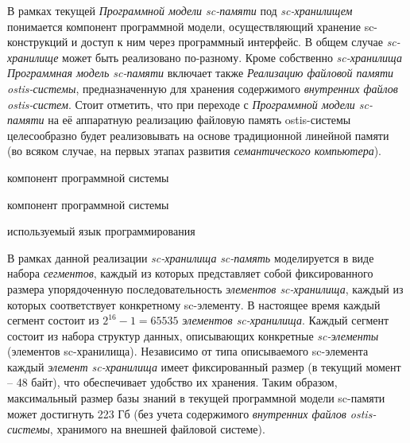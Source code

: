 В рамках текущей \textit{Программной модели sc-памяти} под \textit{sc-хранилищем} понимается компонент программной
модели, осуществляющий хранение sc-конструкций и доступ к ним через программный интерфейс. В общем случае
\textit{sc-хранилище} может быть реализовано по-разному. Кроме собственно \textit{sc-хранилища}
\textit{Программная модель sc-памяти} включает также \textit{Реализацию файловой памяти ostis-системы},
предназначенную для хранения содержимого \textit{внутренних файлов ostis-систем}. Стоит отметить, что при переходе с
\textit{Программной модели sc-памяти} на её аппаратную реализацию файловую память ostis-системы целесообразно будет
реализовывать на основе традиционной линейной памяти (во всяком случае, на первых этапах развития
\textit{семантического компьютера}).

\begin{SCn}
\begin{scnrelfromlist}{компонент программной системы}
    \begin{scnrelfromlist}{компонент программной системы}
    \end{scnrelfromlist}
\end{scnrelfromlist}
\begin{scnrelfromlist}{используемый язык программирования}
\end{scnrelfromlist}
\end{SCn}

В рамках данной реализации \textit{sc-хранилища} \textit{sc-память} моделируется в виде набора \textit{сегментов},
каждый из которых представляет собой фиксированного размера упорядоченную последовательность \textit{элементов sc-хранилища},
каждый из которых соответствует конкретному sc-элементу. В настоящее время каждый сегмент состоит из $2^{16}-1=65535$
\textit{элементов sc-хранилища}. Каждый сегмент состоит из набора структур данных, описывающих конкретные
\textit{sc-элементы} (элементов sc-хранилища). Независимо от типа описываемого sc-элемента каждый \textit{элемент sc-хранилища}
имеет фиксированный размер (в текущий момент -- 48 байт), что обеспечивает удобство их хранения. Таким образом,
максимальный размер базы знаний в текущей программной модели sc-памяти может достигнуть 223 Гб (без учета содержимого
\textit{внутренних файлов ostis-системы}, хранимого на внешней файловой системе).

